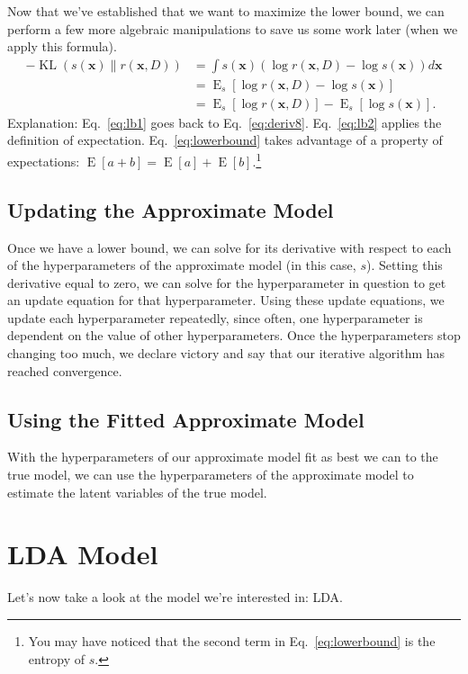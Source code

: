 \documentclass[12pt]{article}
\newcommand{\KL}{\operatorname{KL}}
\newcommand{\E}{\operatorname{E}}
\begin{document}
Now that we've established that we want to maximize the lower bound, we can
perform a few more algebraic manipulations to save us some work later (when we
apply this formula).
\begin{align}
    -\KL(s(\bm{x}) \parallel r(\bm{x}, D)) &= \int s(\bm{x})\left(\log{r(\bm{x},
    D)} - \log{s(\bm{x})}\right) d\bm{x}\label{eq:lb1} \\
    &= \E_{s}[\log{r(\bm{x},D)} - \log{s(\bm{x})}]\label{eq:lb2} \\
    &= \E_{s}[\log{r(\bm{x}, D)}] - \E_{s}[\log{s(\bm{x})}].
    \label{eq:lowerbound}
\end{align}
Explanation:  Eq.~\ref{eq:lb1} goes back to Eq.~\ref{eq:deriv8}.
Eq.~\ref{eq:lb2} applies the definition of expectation.  Eq.~\ref{eq:lowerbound}
takes advantage of a property of expectations:  $\E[a + b] = \E[a] +
\E[b]$.\footnote{You may have noticed that the second term in
Eq.~\ref{eq:lowerbound} is the entropy of $s$.}

\subsection{Updating the Approximate Model}

Once we have a lower bound, we can solve for its derivative with respect to each
of the hyperparameters of the approximate model (in this case, $s$).  Setting
this derivative equal to zero, we can solve for the hyperparameter in question
to get an update equation for that hyperparameter.  Using these update
equations, we update each hyperparameter repeatedly, since often, one
hyperparameter is dependent on the value of other hyperparameters.  Once the
hyperparameters stop changing too much, we declare victory and say that our
iterative algorithm has reached convergence.

\subsection{Using the Fitted Approximate Model}

With the hyperparameters of our approximate model fit as best we can to the
true model, we can use the hyperparameters of the approximate model to estimate
the latent variables of the true model.

\section{LDA Model}

Let's now take a look at the model we're interested in:  LDA.
\end{document}
